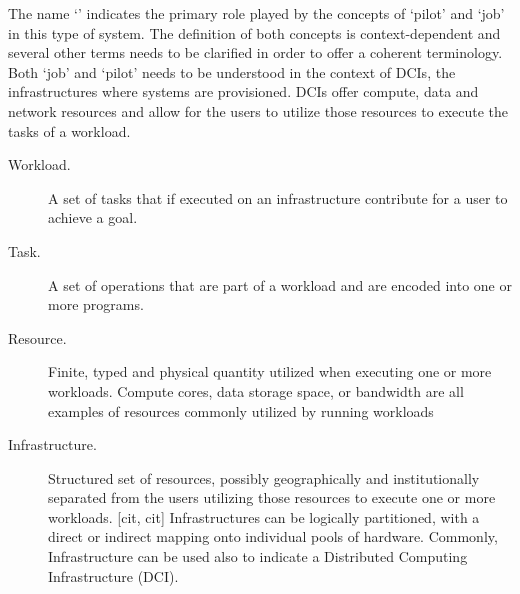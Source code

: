 \documentclass{sig-alternate}
\begin{document}

The name `\pilotjob' indicates the primary role played by the concepts of
`pilot' and `job' in this type of system. The definition of both concepts is
context-dependent and several other terms needs to be clarified in order to
offer a coherent terminology. Both `job' and `pilot' needs to be understood in
the context of DCIs, the infrastructures where \pilotjobs systems are
provisioned. DCIs offer compute, data and network resources and \pilotjobs
allow for the users to utilize those resources to execute the tasks of a
workload.

\begin{description}

\item[Workload.] A set of tasks that if executed on an infrastructure
contribute for a user to achieve a goal.

\item[Task.] A set of operations that are part of a workload and are encoded
into one or more programs.


\item[Resource.] Finite, typed and physical quantity utilized when
  executing one or more workloads. Compute cores, data storage space,
  or bandwidth are all examples of resources commonly utilized by
  running workloads

\item[Infrastructure.] Structured set of resources, possibly geographically and
institutionally separated from the users utilizing those resources to execute
one or more workloads. [cit, cit] Infrastructures can be logically partitioned,
with a direct or indirect mapping onto individual pools of hardware. Commonly,
Infrastructure can be used also to indicate a Distributed Computing
Infrastructure (DCI). \end{description}
\end{document}

